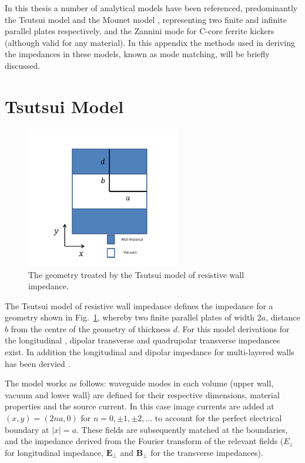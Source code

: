 \label{app:analyticalMods}

In this thesis a number of analytical models have been referenced, predominantly the Tsutsui model \cite{Tsutsui:ferrKickLong,Tsutsui:DipoleKicker,Salvant:QuadKicker} and the Mounet model \cite{Mounet:PhDThesis}, representing two finite and infinite parallel plates respectively, and the Zannini mode \cite{Zannini:cCoreFerrite} for C-core ferrite kickers (although valid for any material). In this appendix the methods used in deriving the impedances in these models, known as mode matching, will be briefly discussed.

\section{Tsutsui Model}

\begin{figure}
\begin{center}
\includegraphics[width=0.6\textwidth]{appendices/figures/tsutsui-geometry.pdf}
\end{center}
\caption{The geometry treated by the Tsutsui model of resistive wall impedance.}
\label{fig:TsutsuiGeo}
\end{figure}

The Tsutsui model of resistive wall impedance defines the impedance for a geometry shown in Fig.~\ref{fig:TsutsuiGeo}, whereby two finite parallel plates of width $2a$, distance $b$ from the centre of the geometry of thickness $d$. For this model derivations for the longitudinal  \cite{Tsutsui:ferrKickLong}, dipolar transverse \cite{Tsutsui:DipoleKicker} and quadrupolar transverse \cite{Salvant:QuadKicker} impedances exist. In addition the longitudinal and dipolar impedance for multi-layered walls has been dervied \cite{Tsutsui:resWallCol}. 

The model works as follows: waveguide modes in each volume (upper wall, vacuum and lower wall) are defined for their respective dimensions, material properties and the source current. In this case image currents are added at $(x,y) = (2na, 0)$ for $n = 0, \pm 1, \pm 2,...$ to account for the perfect electrical boundary at $| x | = a$. These fields are subsequently matched at the boundaries, and the impedance derived from the Fourier transform of the relevant fields ($E_{z}$ for longitudinal impedance, $\mathbf{E}_{\perp}$ and $\mathbf{B}_{\perp}$ for the transverse impedances). 

